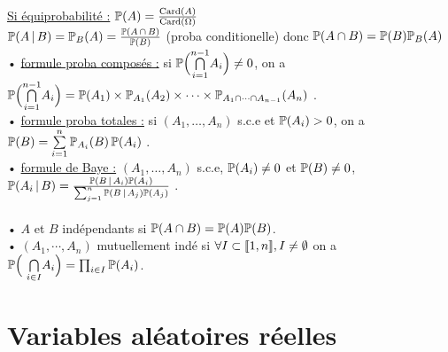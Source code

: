 \documentclass[12 pt]{book}
\begin{document}
\begin{flushleft}
\begin{doublespace}
	\text{ }\\
	\underline{Si équiprobabilité :} $\mathbb{P}(A) = \frac{\text{Card}(A)}{\text{Card}(\Omega)}$\\
	$\mathbb{P}(A \, | \, B) = \mathbb{P}_B(A) = \frac{\mathbb{P}(A\,\cap\,B)}{\mathbb{P}(B)}$ (proba conditionelle) donc $\mathbb{P}(A \cap B) = \mathbb{P}(B)\mathbb{P}_B(A)$\\
	• \underline{formule proba composés :} si $\mathbb{P} \Big( \underset{i = 1}{\overset{n - 1}{\bigcap}} A_i \Big) \ne 0$, on a $\mathbb{P} \Big( \underset{i = 1}{\overset{n - 1}{\bigcap}} A_i \Big) = \mathbb{P}(A_1) \times \mathbb{P}_{A_1}(A_2)\times \dots \times \mathbb{P}_{A_1 \cap \dots \cap A_{n - 1}} (A_n)$ .\\
	• \underline{formule proba totales :} si $(A_1,\dots, A_n)$ s.c.e et $\mathbb{P}(A_i) > 0$, on a $\mathbb{P}(B) = \sum\limits_{i = 1}^n \mathbb{P}_{A_i}(B)\, \mathbb{P}(A_i)$ .\\
	• \underline{formule de Baye :} $(A_1,\dots, A_n)$ s.c.e, $\mathbb{P}(A_i) \ne 0$ et $\mathbb{P}(B)\ne 0$, $\mathbb{P}(A_i \, | \, B) = \frac{\mathbb{P}( B \, | \, A_i) \mathbb{P}(A_i)}{\sum_{j = 1}^n \mathbb{P}( B \, | \, A_j) \mathbb{P} (A_j)}$ .\\
	
	\text{ }\\
	• $A$ et $B$  indépendants si $\mathbb{P}(A \cap B) = \mathbb{P}(A)\mathbb{P}(B)$.\\
	• $(A_1,\cdots, A_n)$ mutuellement indé si $\forall I \subset \llbracket 1,n \rrbracket , I \ne \emptyset$ on a $\mathbb{P}\Big(\ \underset{i \in I}{\bigcap} A_i \Big) = \prod_{i\in I} \mathbb{P}(A_i)$.\\

\end{doublespace}
\end{flushleft}

\section*{Variables aléatoires réelles}
\end{document}
